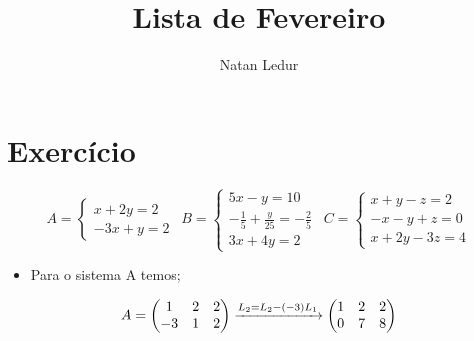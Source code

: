 \documentclass{article}
\title{Lista de Fevereiro}
\author{Natan Ledur}
\begin{document}
\maketitle

\section{Exercício }
\begin{equation*}
      A= \left\{\begin{matrix} x + 2y = 2 \\  -3x + y=2 \end{matrix}\right. 
       \ \
      B = \left\{\begin{matrix} 5x - y = 10 \\ -\frac{1}{5} + \frac{y}{25} = -\frac{2}{5} \\ 3x+4y=2 \end{matrix}\right.
      \ \
      C = \left\{\begin{matrix}  x + y - z = 2 \\ -x -y +z = 0 \\ x+2y-3z=4 \end{matrix}\right.
      \end{equation*}
      \begin{itemize}
          \item Para o sistema A temos;
      \end{itemize}
      \begin{equation*}
      A=\begin{pmatrix}  1&2  &2 \\   -3&  1& 2\end{pmatrix}
      \xrightarrow[]{L_2=L_2 - (-3)L_1}
      \begin{pmatrix} 1 &2  &2 \\  0& 7 & 8 \end{pmatrix}\displaystyle \displaystyle 
      \end{equation*}
       
\end{document}
